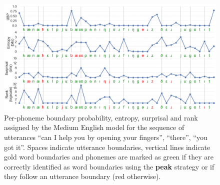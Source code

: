 
\begin{figure}
    \centering
    \includegraphics[width=\linewidth]{Figures/15Phonology/qualitative.png}
    \caption{Per-phoneme boundary probability, entropy, surprisal and rank assigned by the Medium English model for the sequence of utterances ``can I help you by opening your fingers'', ``there'', ``you got it''. Spaces indicate utterance boundaries, vertical lines indicate gold word boundaries and phonemes are marked as green if they are correctly identified as word boundaries using the \textbf{peak} strategy or if they follow an utterance boundary (red otherwise).}
    \label{fig:15-qualitative}
\end{figure}



